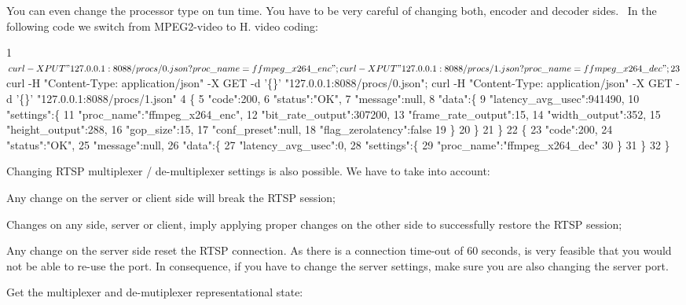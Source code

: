You can even change the processor type on tun time. You have to be very careful of changing both, encoder and decoder sides.~\newline
 In the following code we switch from M\+P\+E\+G2-\/video to H. video coding\+: 
\begin{DoxyCode}
1 $ curl -X PUT "127.0.0.1:8088/procs/0.json?proc\_name=ffmpeg\_x264\_enc"; curl -X PUT
       "127.0.0.1:8088/procs/1.json?proc\_name=ffmpeg\_x264\_dec";
2 
3 $ curl -H "Content-Type: application/json" -X GET -d '\{\}' "127.0.0.1:8088/procs/0.json"; curl -H
       "Content-Type: application/json" -X GET -d '\{\}' "127.0.0.1:8088/procs/1.json"
4 \{
5    "code":200,
6    "status":"OK",
7    "message":null,
8    "data":\{
9       "latency\_avg\_usec":941490,
10       "settings":\{
11          "proc\_name":"ffmpeg\_x264\_enc",
12          "bit\_rate\_output":307200,
13          "frame\_rate\_output":15,
14          "width\_output":352,
15          "height\_output":288,
16          "gop\_size":15,
17          "conf\_preset":null,
18          "flag\_zerolatency":false
19       \}
20    \}
21 \}
22 \{
23    "code":200,
24    "status":"OK",
25    "message":null,
26    "data":\{
27       "latency\_avg\_usec":0,
28       "settings":\{
29          "proc\_name":"ffmpeg\_x264\_dec"
30       \}
31    \}
32 \}
\end{DoxyCode}


Changing R\+T\+SP multiplexer / de-\/multiplexer settings is also possible. We have to take into account\+:
\begin{DoxyItemize}
\item Any change on the server or client side will break the R\+T\+SP session;
\item Changes on any side, server or client, imply applying proper changes on the other side to successfully restore the R\+T\+SP session;
\item Any change on the server side reset the R\+T\+SP connection. As there is a connection time-\/out of 60 seconds, is very feasible that you would not be able to re-\/use the port. In consequence, if you have to change the server settings, make sure you are also changing the server port.
\end{DoxyItemize}

Get the multiplexer and de-\/mutiplexer representational state\+:


